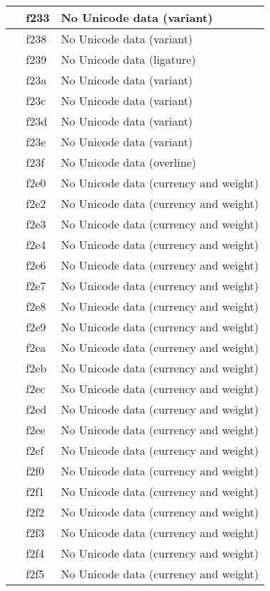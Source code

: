 \documentclass[12pt,letterpaper,openany]{book}
\begin{document}
\begin{center}
\begin{supertabular}{|m{0.25in}|m{0.5in}|m{4in}|}
 & f233 & No Unicode data (variant)\\\hline
 & f238 & No Unicode data (variant)\\\hline
 & f239 & No Unicode data (ligature)\\\hline
 & f23a & No Unicode data (variant)\\\hline
 & f23c & No Unicode data (variant)\\\hline
 & f23d & No Unicode data (variant)\\\hline
 & f23e & No Unicode data (variant)\\\hline
 & f23f & No Unicode data (overline)\\\hline
 & f2e0 & No Unicode data (currency and weight)\\\hline
 & f2e2 & No Unicode data (currency and weight)\\\hline
 & f2e3 & No Unicode data (currency and weight)\\\hline
 & f2e4 & No Unicode data (currency and weight)\\\hline
 & f2e6 & No Unicode data (currency and weight)\\\hline
 & f2e7 & No Unicode data (currency and weight)\\\hline
 & f2e8 & No Unicode data (currency and weight)\\\hline
 & f2e9 & No Unicode data (currency and weight)\\\hline
 & f2ea & No Unicode data (currency and weight)\\\hline
 & f2eb & No Unicode data (currency and weight)\\\hline
 & f2ec & No Unicode data (currency and weight)\\\hline
 & f2ed & No Unicode data (currency and weight)\\\hline
 & f2ee & No Unicode data (currency and weight)\\\hline
 & f2ef & No Unicode data (currency and weight)\\\hline
 & f2f0 & No Unicode data (currency and weight)\\\hline
 & f2f1 & No Unicode data (currency and weight)\\\hline
 & f2f2 & No Unicode data (currency and weight)\\\hline
 & f2f3 & No Unicode data (currency and weight)\\\hline
 & f2f4 & No Unicode data (currency and weight)\\\hline
 & f2f5 & No Unicode data (currency and weight)\\\hline

\end{supertabular}
\end{center}
\end{document}
